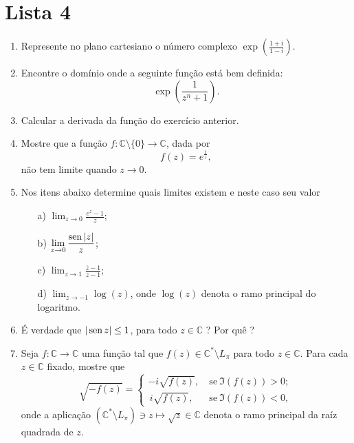 \chapter*{Lista 4}



\begin{enumerate}[leftmargin=*]


\item Represente no plano cartesiano o número complexo 
$\displaystyle\exp\left( \frac{1+i}{1-i} \right)$.

\item Encontre o domínio onde a seguinte função está bem definida:
$$
\exp\left(  \frac{1}{z^n+1}  \right).
$$
\item Calcular a derivada da função do exercício anterior.
	



\item Mostre que a função $f:\mathbb{C}\setminus\{0\}\to\mathbb{C}$, dada por 
$$
f(z)=\displaystyle e^{\frac{1}{z}},
$$
não tem limite quando $z\to 0$.


	\item Nos itens abaixo determine quais limites existem e neste caso seu valor
\begin{itemize}
	\item[a)] $\displaystyle\lim_{z\to 0}\frac{e^z-1}{z}$;\\[0.2cm]
	\item[b)] $\displaystyle\lim_{z\to 0}\frac{\operatorname{sen} |z|}{z}$;\\[0.3cm]
	\item[c)] $\displaystyle\lim_{z\to 1}\frac{\overline{z}-1}{z-1}$;\\[0.3cm]
	\item[d)] $\displaystyle\lim_{z\to -1}\log(z)$, onde $\log(z)$ denota o ramo principal do logaritmo.
\end{itemize}
	\item É verdade que $|\operatorname{sen} z|\leq 1$, para todo $z\in\mathbb{C}$ ? Por quê ?
	
	
	\item Seja $f:\mathbb{C}\to\mathbb{C}$ uma função tal que 
	$f(z)\in \mathbb{C}^{*}\setminus L_{\pi}$ para todo $z\in \mathbb{C}$.
	Para cada $z\in\mathbb{C}$ fixado, mostre que
	\[
		\sqrt{-f(z)}
		=
		\begin{cases}
			-i \sqrt{f(z)},&\ \text{se}\ \Im(f(z))>0;
			\\[0.2cm]
			\, i \sqrt{f(z)},&\ \text{se}\ \Im(f(z))<0,
		\end{cases}
	\]
	onde a aplicação $(\mathbb{C}^{*}\setminus L_{\pi})\ni z\longmapsto \sqrt{z}\in\mathbb{C}$
	denota o ramo principal da raíz quadrada de $z$.


\end{enumerate}
